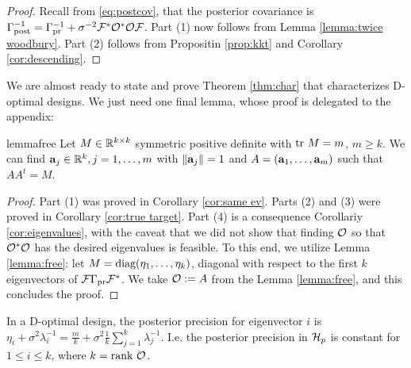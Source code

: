 \begin{proof}
  Recall from \eqref{eq:postcov}, that the posterior covariance is
  $\Gamma_{\textup{post}}^{-1} = \Gamma_{\textup{pr}}^{-1} +
  \sigma^{-2}\mathcal{F}^*\mathcal{O}^*\mathcal{O}\mathcal{F}$. Part (1) now follows from Lemma
  \ref{lemma:twice woodbury}. Part (2) follows from Propositin
  \ref{prop:kkt} and Corollary \ref{cor:descending}.
\end{proof}

We are almost ready to state and prove Theorem \ref{thm:char} that
characterizes D-optimal designs. We just need one final lemma, whose
proof is delegated to the appendix:
\begin{restatable*}{lemma}{free}\label{lemma:free}
  Let $M \in \mathbb{R}^{k \times k}$ symmetric positive definite with $\textup{tr}\ M
  = m$, $m \geq k$. We can find $\mathbf{a}_j \in \mathbb{R}^k,j=1,\dots,m$
  with $\|\mathbf{a}_j\|=1$ and $A = (\mathbf{a}_1,\dots,\mathbf{a}_m)$ such that
  $AA^t = M$.
\end{restatable*}


\main

\begin{proof}
  Part (1) was proved in Corollary \ref{cor:same ev}. Parts (2) and
  (3) were proved in Corollary \ref{cor:true target}. Part (4) is a
  consequence Corollariy \ref{cor:eigenvalues}, with the caveat that
  we did not show that finding $\mathcal{O}$ so that $\mathcal{O}^*\mathcal{O}$ has the
  desired eigenvalues is feasible. To this end, we utilize Lemma
  \ref{lemma:free}: let $M = \textup{diag}(\eta_1, \dots, \eta_k)$, diagonal
  with respect to the first $k$ eigenvectors of $\mathcal{F} \Gamma_{\textup{pr}}
  \mathcal{F}^*$. We take $\mathcal{O} := A$ from the Lemma \ref{lemma:free}, and
  this concludes the proof.
\end{proof}

\begin{corollary}
  In a D-optimal design, the posterior precision for eigenvector $i$
  is $\eta_i + \sigma^2 \lambda_i^{-1} = \frac{m}{k} + \sigma^2
  \frac{1}{k} \sum_{j=1}^k \lambda_j^{-1}$. I.e. the posterior
  precision in $\mathcal{H}_p$ is constant for $1 \leq i \leq k$, where $k
  =\textup{rank}\  \mathcal{O}$.
\end{corollary}

\optimalvsnot


